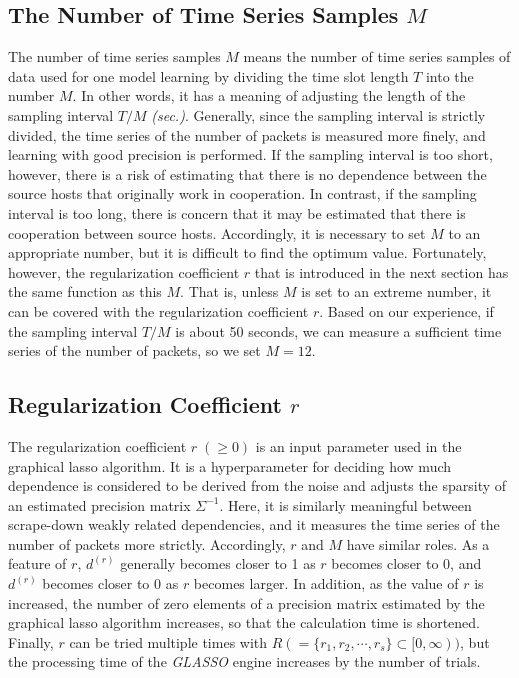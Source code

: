 \documentclass[conference]{IEEEtran}
\begin{document}
\subsection{The Number of Time Series Samples $M$}
The number of time series samples $M$ means the number of time series samples of data used for one model learning by dividing the time slot length $T$ into the number $M$.
In other words, it has a meaning of adjusting the length of the sampling interval $T/M$ {\it (sec.)}.
Generally, since the sampling interval is strictly divided, the time series of the number of packets is measured more finely, and learning with good precision is performed.
If the sampling interval is too short, however, there is a risk of estimating that there is no dependence between the source hosts that originally work in cooperation.
In contrast, if the sampling interval is too long, there is concern that it may be estimated that there is cooperation between source hosts.
Accordingly, it is necessary to set $M$ to an appropriate number, but it is difficult to find the optimum value.
Fortunately, however, the regularization coefficient $r$ that is introduced in the next section has the same function as this $M$.
That is, unless $M$ is set to an extreme number, it can be covered with the regularization coefficient $r$.
Based on our experience, if the sampling interval $T/M$ is about 50 seconds, we can measure a sufficient time series of the number of packets, so we set $M=12$.





\subsection{Regularization Coefficient $r$}
The regularization coefficient $r\;(\geq 0)$ is an input parameter used in the graphical lasso algorithm.
It is a hyperparameter for deciding how much dependence is considered to be derived from the noise and adjusts the sparsity of an estimated precision matrix $\Sigma^{-1}$.
Here, it is similarly meaningful between scrape-down weakly related dependencies, and it measures the time series of the number of packets more strictly.
Accordingly, $r$ and $M$ have similar roles.
As a feature of $r$, $d^{(r)}$ generally becomes closer to 1 as $r$ becomes closer to 0, and $d^{(r)}$ becomes closer to 0 as $r$ becomes larger.
In addition, as the value of $r$ is increased, the number of zero elements of a precision matrix estimated by the graphical lasso algorithm increases, so that the calculation time is shortened.
Finally, $r$ can be tried multiple times with $R ( = \{r_1, r_2, \cdots, r_s\}\subset [0,\infty))$, but the processing time of the {\it GLASSO} engine increases by the number of trials.
\end{document}
